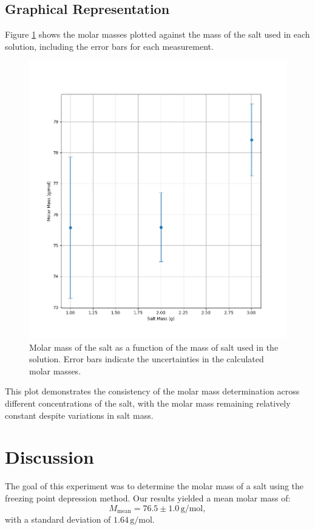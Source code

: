 \documentclass[a4paper,12pt]{article}
\begin{document}
\subsection{Graphical Representation}
Figure \ref{fig:molar_mass_plot} shows the molar masses plotted against the mass of the salt used in each solution, including the error bars for each measurement.

\begin{figure}[H]
    \centering
    \includegraphics[width=\textwidth]{images/molar_mass_by_salt_mass.png}
    \caption{Molar mass of the salt as a function of the mass of salt used in the solution. Error bars indicate the uncertainties in the calculated molar masses.}
    \label{fig:molar_mass_plot}
\end{figure}

This plot demonstrates the consistency of the molar mass determination across different concentrations of the salt, with the molar mass remaining relatively constant despite variations in salt mass.

\section{Discussion}
The goal of this experiment was to determine the molar mass of a salt using the freezing point depression method. Our results yielded a mean molar mass of:
\begin{equation*}
M_{\text{mean}} = 76.5 \pm 1.0 \, \text{g/mol},
\end{equation*}
with a standard deviation of $1.64 \, \text{g/mol}$.
\end{document}
